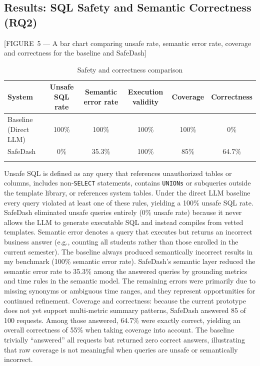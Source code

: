 \documentclass[11pt]{article}
\begin{document}
\subsection{Results: SQL Safety and Semantic Correctness (RQ2)}
[FIGURE 5 — A bar chart comparing unsafe rate, semantic error rate, coverage and correctness for the baseline and SafeDash]

\begin{longtable}{lccccc}
\toprule
\textbf{System} & \textbf{Unsafe SQL rate} & \textbf{Semantic error rate} & \textbf{Execution validity} & \textbf{Coverage} & \textbf{Correctness}\\
\midrule
Baseline (Direct LLM) & 100\% & 100\% & 100\% & 100\% & 0\%\\
SafeDash & 0\% & 35.3\% & 100\% & 85\% & 64.7\%\\
\bottomrule
\caption{Safety and correctness comparison}\label{tab:safety}
\end{longtable}

Unsafe SQL is defined as any query that references unauthorized tables or columns, includes non‑\texttt{SELECT} statements, contains \texttt{UNIONs} or subqueries outside the template library, or references system tables. Under the direct LLM baseline every query violated at least one of these rules, yielding a 100\% unsafe SQL rate. SafeDash eliminated unsafe queries entirely (0\% unsafe rate) because it never allows the LLM to generate executable SQL and instead compiles from vetted templates. Semantic error denotes a query that executes but returns an incorrect business answer (e.g., counting all students rather than those enrolled in the current semester). The baseline always produced semantically incorrect results in my benchmark (100\% semantic error rate). SafeDash’s semantic layer reduced the semantic error rate to 35.3\% among the answered queries by grounding metrics and time rules in the semantic model. The remaining errors were primarily due to missing synonyms or ambiguous time ranges, and they represent opportunities for continued refinement. Coverage and correctness: because the current prototype does not yet support multi‑metric summary patterns, SafeDash answered 85 of 100 requests. Among those answered, 64.7\% were exactly correct, yielding an overall correctness of 55\% when taking coverage into account. The baseline trivially “answered” all requests but returned zero correct answers, illustrating that raw coverage is not meaningful when queries are unsafe or semantically incorrect.
\end{document}
